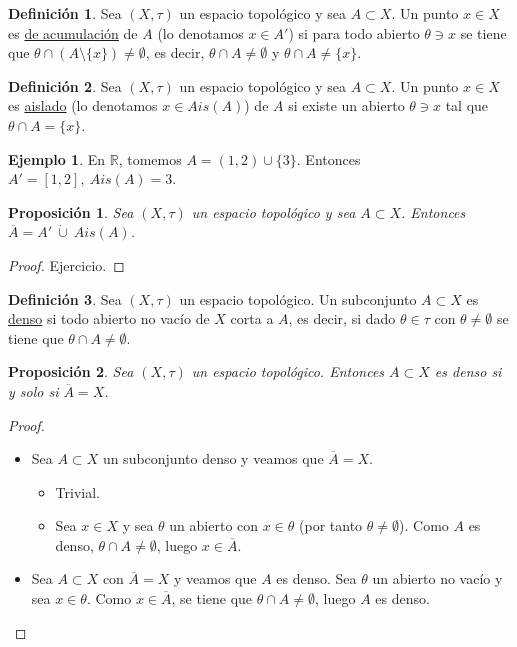 \documentclass[12pt]{report}
\newtheorem{proposition}{Proposición}[chapter]
\theoremstyle{definition}
\newtheorem{definition}{Definición}[chapter]
\theoremstyle{definition}
\newtheorem{example}{Ejemplo}[chapter]
\theoremstyle{remark}
\newcommand{\R}{\mathbb R}
\begin{document}
\begin{definition}
Sea $(X,\tau)$ un espacio topológico y sea $A \subset X$. Un punto $x \in X$ es \underline{de acumulación} de $A$ (lo denotamos $x \in A'$) si para todo abierto $\theta \ni x$ se tiene que $\theta \cap (A \setminus \{x\}) \neq \emptyset$, es decir, $\theta \cap A \neq \emptyset$ y $\theta \cap A \neq \{x\}$.
\end{definition}

\begin{definition}
Sea $(X,\tau)$ un espacio topológico y sea $A \subset X$. Un punto $x \in X$ es \underline{aislado} (lo denotamos $x \in Ais(A)$) de $A$ si existe un abierto $\theta \ni x$ tal que $\theta \cap A = \{x\}$.
\end{definition}

\begin{example}
En $\R$, tomemos $A = (1,2) \cup \{3\}$. Entonces $A' = [1,2], \ Ais(A) = 3$.
\end{example}

\begin{proposition}
Sea $(X,\tau)$ un espacio topológico y sea $A \subset X$. Entonces $\overline{A} = A' \ \dot\cup \ Ais(A)$.
\end{proposition}

\begin{proof}
Ejercicio.
\end{proof}

\vspace{2mm}
\begin{definition}
Sea $(X,\tau)$ un espacio topológico. Un subconjunto $A \subset X$ es \underline{denso} si todo abierto no vacío de $X$ corta a $A$, es decir, si dado $\theta \in \tau$ con $\theta \neq \emptyset$ se tiene que $\theta \cap A \neq \emptyset$.
\end{definition}

\begin{proposition}
Sea $(X,\tau)$ un espacio topológico. Entonces $A \subset X$ es denso si y solo si $\overline{A} = X$.
\end{proposition}

\begin{proof}
\hfill
\begin{itemize}
    \item[{\fbox[rb]{$\Rightarrow$}}] Sea $A \subset X$ un subconjunto denso y veamos que $\overline{A} = X$.
        \begin{itemize}
            \item[{\fbox[rb]{$\subset$}}] Trivial.
            \item[{\fbox[rb]{$\supset$}}] Sea $x \in X$ y sea $\theta$ un abierto con $x \in \theta$ (por tanto $\theta \neq \emptyset$). Como $A$ es denso, $\theta \cap A \neq \emptyset$, luego $x \in \overline{A}$.
        \end{itemize}
    \item[{\fbox[rb]{$\Leftarrow$}}] Sea $A \subset X$ con $\overline{A} = X$ y veamos que $A$ es denso. Sea $\theta$ un abierto no vacío y sea $x \in \theta$. Como $x \in \overline{A}$, se tiene que $\theta \cap A \neq \emptyset$, luego $A$ es denso. 
\end{itemize}
\end{proof}
\end{document}
